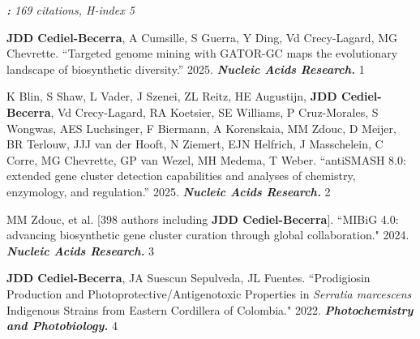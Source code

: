 
\textit{\textbf{:} 169 citations, H-index 5}

 \vspace{-2mm}

\begin{cvpubs}

\cvpub
{\textbf{JDD Cediel-Becerra}, A Cumsille, S Guerra, Y Ding, Vd Crecy-Lagard, MG Chevrette. ``Targeted genome mining with GATOR-GC maps the evolutionary landscape of biosynthetic diversity.'' 2025. \textit{\textbf{Nucleic Acids Research.}} \textit{\textbf{}}}
{1}

\cvpub
{K Blin, S Shaw, L Vader, J Szenei, ZL Reitz, HE Augustijn, \textbf{JDD Cediel-Becerra}, Vd Crecy-Lagard, RA Koetsier, SE Williams, P Cruz-Morales, S Wongwas, AES Luchsinger, F Biermann, A Korenskaia, MM Zdouc, D Meijer, BR Terlouw, JJJ van der Hooft, N Ziemert, EJN Helfrich, J Masschelein, C Corre, MG Chevrette, GP van Wezel, MH Medema, T Weber. ``antiSMASH 8.0: extended gene cluster detection capabilities and analyses of chemistry, enzymology, and regulation.'' 2025. \textit{\textbf{Nucleic Acids Research.}} \textit{\textbf{}}}
{2}

\cvpub
{MM Zdouc, et al. [398 authors including \textbf{JDD Cediel-Becerra}]. ``MIBiG 4.0: advancing biosynthetic gene cluster curation through global collaboration." 2024. \textit{\textbf{Nucleic Acids Research.}} \textit{\textbf{}}}
{3}

\cvpub
{\textbf{JDD Cediel-Becerra}, JA Suescun Sepulveda, JL Fuentes. ``Prodigiosin Production and Photoprotective/Antigenotoxic Properties in \textit{Serratia marcescens} Indigenous Strains from Eastern Cordillera of Colombia." 2022. \textit{\textbf{Photochemistry and Photobiology.}}\textit{\textbf{}}}
{4}
\end{cvpubs}


 \vspace{-2mm}

